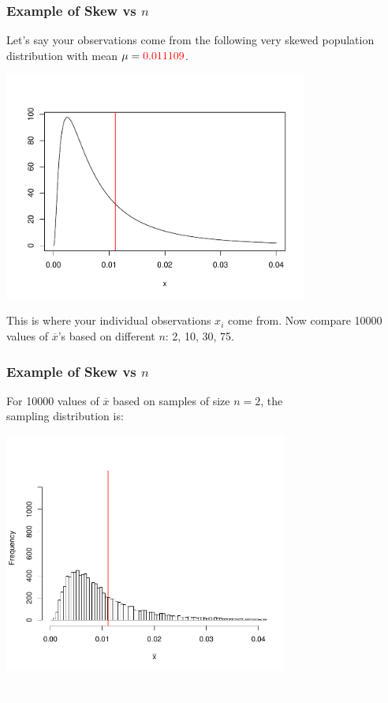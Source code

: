 \documentclass[handout]{beamer}
\newcommand{\blue}[1]{\textcolor{blue2}{#1}}
\newcommand{\white}[1]{\textcolor{white}{#1}}
\newcommand{\xbar}{\overline{x}}
\begin{document}
\begin{frame}
\frametitle{Example of Skew vs $n$}
Let's say your observations come from the following very skewed \blue{population distribution} with mean $\mu=\textcolor{red}{0.011109}$. 
\begin{center}
\pause\includegraphics[width=0.75\textwidth]{figure/true.pdf}
\end{center}
\pause  This is where your individual observations $x_i$ come from.  \pause Now compare 10000 values of $\xbar$'s based on different $n$:  2, 10, 30, 75.   
\end{frame}


\begin{frame}
\frametitle{Example of Skew vs $n$}
For 10000 values of $\xbar$ based on samples of size \blue{$n=2$}, the\\
sampling distribution is:
\begin{center}
\includegraphics[width=0.7\textwidth]{figure/hist2.pdf}
\end{center}
\white{i.e. more normal and more narrow}
\end{frame}
\end{document}

